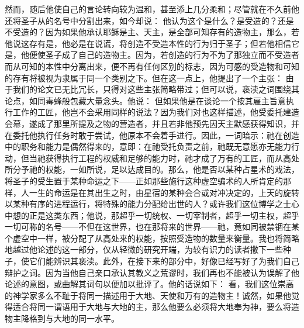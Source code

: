 然而，随后他使自己的言论转向较为温和，甚至添上几分柔和；尽管就在不久前他还将圣子从的名号中分割出来，如今却说： 他认为这个是什么？是受造的？还是不受造的？因为如果他承认耶稣是主、天主，是全部可知存有的造物主，那么，若他说这存有是，他必是在说谎，将创造不受造本性的行为归于圣子；但若他相信它是，他便使圣子成了自己的造物主。因为，若创造的行为不为了那独立而不受造者而从可知的本性中分离出来，便不再有任何区别的标志，因为可感的受造物和可知的存有将被视为隶属于同一个类别之下。但在这一点上，他提出了一个主张： 由于我们的论文已无比冗长，只得对这些主张简略带过；但可以说，亵渎之词围绕其论点，如同毒蜂般包藏大量念头。他说： 但如果他是在谈论一个按其雇主旨意执行工作的工匠，他岂不会采用同样的说法？因为我们对也这样描述，他受委托建造会幕，遂成了那里所提及之物的营造者，并且若非他预先因天主默感获得知识，并在委托他执行任务时敢于尝试，他原本不会着手进行。因此，一词暗示：祂在创造中的职务和能力是偶然得来的，意即：在祂受托负责之前，祂既无意愿亦无能力行动，但当祂获得执行工程的权威和足够的能力时，祂才成了万有的工匠，而从高处所分予祂的权能，一如所说，足以达成目的。那么，他是否以某种占星术的戏法，将圣子的受生置于某种命运之下——正如那些施行这种虚空骗术的人所肯定的那样，人一生的命运是在其出生之时，由星宿的某种会合或对冲决定的，上天的旋转以某种有序的进程运行，将特殊的能力分配给出世的人？或许我们这位博学之士心中想的正是这类东西；他说，那超乎一切统权、一切宰制者，超乎一切主权，超乎一切可称的名号——不但在这世界，也在那将来的世界——祂，竟如同被禁锢在某个虚空中一样，被分配了从高处来的权能，按照受造物的数量来衡量。我也将简略地越过他论述的这一部分，仅从轻微的研究开端，为较有识力的读者撒下一些种子，使它们能辨识其亵渎。此外，在接下来的部分中，好像已经写好了为我们自己辩护之词。因为当他自己亲口承认其教义之荒谬时，我们再也不能被认为误解了他论述的意图，或曲解其词句以便加以批评了。他的话说如下： 看，我们这位崇高的神学家多么不耻于将同一描述用于大地、天使和万有的造物主！诚然，如果他觉得适合将同一谓语用于大地与大地的主，那么他要么必须将大地奉为神，要么将造物主降格到与大地的同一水平。\par

